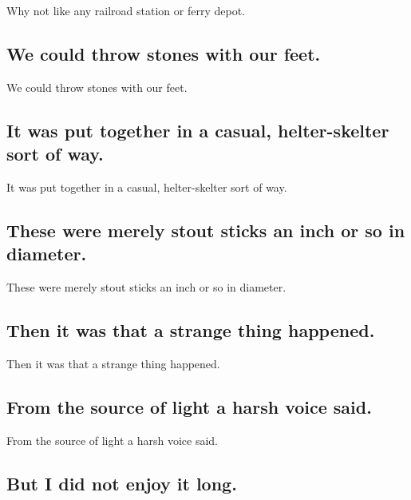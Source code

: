 \documentclass[]{article}
\begin{document}
Why not like any railroad station or ferry depot.

\hypertarget{we-could-throw-stones-with-our-feet.}{%
\subsection{We could throw stones with our
feet.}\label{we-could-throw-stones-with-our-feet.}}

We could throw stones with our feet.

\hypertarget{it-was-put-together-in-a-casual-helter-skelter-sort-of-way.}{%
\subsection{It was put together in a casual, helter-skelter sort of
way.}\label{it-was-put-together-in-a-casual-helter-skelter-sort-of-way.}}

It was put together in a casual, helter-skelter sort of way.

\hypertarget{these-were-merely-stout-sticks-an-inch-or-so-in-diameter.}{%
\subsection{These were merely stout sticks an inch or so in
diameter.}\label{these-were-merely-stout-sticks-an-inch-or-so-in-diameter.}}

These were merely stout sticks an inch or so in diameter.

\hypertarget{then-it-was-that-a-strange-thing-happened.}{%
\subsection{Then it was that a strange thing
happened.}\label{then-it-was-that-a-strange-thing-happened.}}

Then it was that a strange thing happened.

\hypertarget{from-the-source-of-light-a-harsh-voice-said.}{%
\subsection{From the source of light a harsh voice
said.}\label{from-the-source-of-light-a-harsh-voice-said.}}

From the source of light a harsh voice said.

\hypertarget{but-i-did-not-enjoy-it-long.}{%
\subsection{But I did not enjoy it
long.}\label{but-i-did-not-enjoy-it-long.}}
\end{document}
